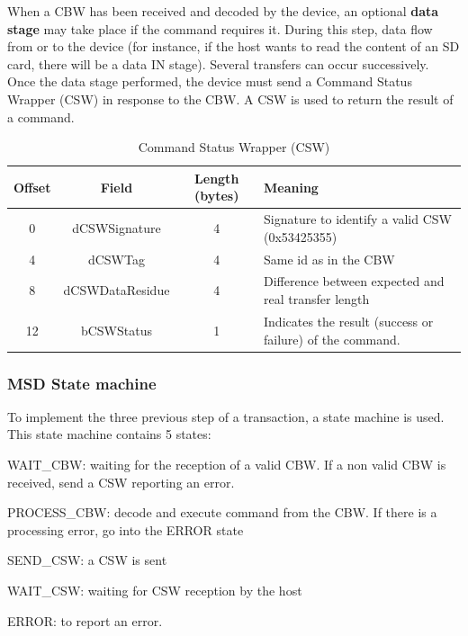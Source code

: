 \documentclass[pdftex,10pt,a4paper]{report}
\newenvironment{packed_item}{
\begin{itemize}
  \setlength{\itemsep}{1pt}
  \setlength{\parskip}{0pt}
  \setlength{\parsep}{0pt}
}{\end{itemize}}
\begin{document}
When a CBW has been received and decoded by the device, an optional \textbf{data stage} may take
place if the command requires it. During this step, data flow from or to the device (for instance, if the host wants to read the content of an SD card, there will be a data IN stage). Several transfers can occur successively.
\\

Once the data stage performed, the device must send a Command Status Wrapper (CSW) in response to the CBW. A CSW is used to return the result of a command.

\begin{table}[h!]
\centering
\begin{tabular}{|c|c|c| >{\arraybackslash}m{9cm} |}
\hline

Offset & Field & Length (bytes) & Meaning \\ \hline
0 & dCSWSignature & 4 & Signature to identify a valid CSW (0x53425355) \\ \hline
4 & dCSWTag & 4 &  Same id as in the CBW \\ \hline
8 & dCSWDataResidue & 4 & Difference between expected and real transfer length \\ \hline
12 & bCSWStatus & 1 & Indicates the result (success or failure) of the command. \\ \hline

\end{tabular}
\caption{Command Status Wrapper (CSW)}
\label{Command Status Wrapper (CSW)}
\end{table}

\subsubsection{MSD State machine}
To implement the three previous step of a transaction, a state machine is used.
This state machine contains 5 states:
\begin{packed_item}
	\item WAIT\_CBW: waiting for the reception of a valid CBW. If a non valid CBW is received, send a CSW reporting an error.
	\item PROCESS\_CBW: decode and execute command from the CBW. If there is a processing error, go into the ERROR state
	\item SEND\_CSW: a CSW is sent
	\item WAIT\_CSW: waiting for CSW reception by the host
	\item ERROR: to report an error.
\end{packed_item}
\end{document}
